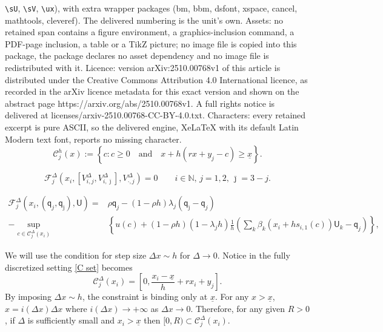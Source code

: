 \documentclass[10pt,a4paper]{amsart}
\def\bq{{\mathsf{q}}}
\def\sU{{\mathsf{U}}}
\newcommand{\Dx}{{\Delta x}}
\newcommand{\D}{\Delta}
\newcommand{\NN}{{\mathbb{N}}}
\newcommand{\beq}{\begin{equation}}
\newcommand{\eeq}{\end{equation}}
\newcommand{\mC}{\mathcal C}
\newcommand{\ux}{{\underline x}}
\begin{document}
\texttt{\textbackslash sU}, \texttt{\textbackslash sV}, \texttt{\textbackslash ux}), with extra wrapper packages (bm, bbm, dsfont, xspace, cancel, mathtools, cleveref). The delivered numbering is the unit's own. Assets: no retained span contains a figure environment, a graphics-inclusion command, a PDF-page inclusion, a table or a TikZ picture; no image file is copied into this package, the package declares no asset dependency and no image file is redistributed with it. Licence: version arXiv:2510.00768v1 of this article is distributed under the Creative Commons Attribution 4.0 International licence, as recorded in the arXiv licence metadata for this exact version and shown on the abstract page https://arxiv.org/abs/2510.00768v1. A full rights notice is delivered at licenses/arxiv-2510.00768-CC-BY-4.0.txt. Characters: every retained excerpt is pure ASCII, so the delivered engine, XeLaTeX with its default Latin Modern text font, reports no missing character.
\begin{equation}\label{C set}
\mC^{h}_{j}(x):=\left\{{c}: c\ge 0\quad\text{and}\quad x+h(rx+y_j-c) \ge \ux \right\}.
\end{equation}

\begin{equation}\label{Scheme}
	\mathcal{F}^\D_j\left(x_i,\left[V^{\Delta}_{i,j},V^{\Delta}_{i,\bar \jmath}\right],V^{\Delta}_{\cdot,j}\right)=0\qquad i\in\NN,\,j=1,2,\,\bar{\jmath}=3-j.
\end{equation}

\begin{equation}\label{def S}
\begin{aligned}
\mathcal{F}^\D_j(x_i,(\bq_j,\bq_{\bar \jmath}),\sU)={}&\rho \bq_j-(1-\rho h)\lambda_j(\bq_{\bar \jmath}-\bq_j)\\
-\sup_{c\in \mC^{\D}_{j}(x_i)}&\left\{
 u(c)+(1-\rho h)(1-\lambda_jh)\frac{1}{h}\left(\sum_k \beta_k(x_i+hs_{i,1}(c))\sU_k-\bq_j  \right)\right\},
\end{aligned}
\end{equation}

\begin{remark}\label{C_j}
We will use the condition for step size $\Dx\sim h$ for $\D\to 0$. Notice in the fully discretized setting \cref{C set} becomes  
\beq\label{Eq:C_j}
\mC^{\D}_{j}(x_i)=\left[0, \frac{x_i-\ux}{h}+rx_i+y_j\right].
\eeq
By imposing $\Dx\sim h$, the constraint is binding only at $\ux$. For any $x>\ux$, $x=i(\D x)\Dx$ where $i(\D x)\to +\infty$ as $\D x\to 0$. Therefore, for any given $R>0$, if $\D$ is sufficiently small and $x_i>\ux$ then $[0,R)\subset \mC^{\D}_{j}(x_i)$. 
\end{remark}
\end{document}

